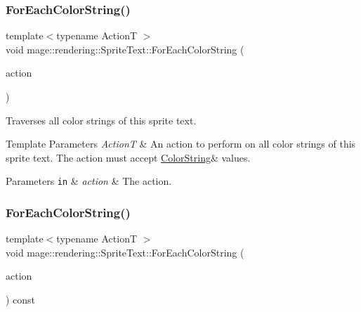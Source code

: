 \subsubsection{\texorpdfstring{For\+Each\+Color\+String()}{ForEachColorString()}\hspace{0.1cm}{\footnotesize\ttfamily [1/2]}}
{\footnotesize\ttfamily template$<$typename ActionT $>$ \\
void mage\+::rendering\+::\+Sprite\+Text\+::\+For\+Each\+Color\+String (\begin{DoxyParamCaption}\item[{ActionT \&\&}]{action }\end{DoxyParamCaption})}

Traverses all color strings of this sprite text.


\begin{DoxyTemplParams}{Template Parameters}
{\em ActionT} & An action to perform on all color strings of this sprite text. The action must accept {\ttfamily \mbox{\hyperlink{classmage_1_1rendering_1_1_color_string}{Color\+String}}\&} values. \\
\hline
\end{DoxyTemplParams}

\begin{DoxyParams}[1]{Parameters}
\mbox{\tt in}  & {\em action} & The action. \\
\hline
\end{DoxyParams}
\mbox{\label{classmage_1_1rendering_1_1_sprite_text_a4d53ac7323640025e6ef78f3863703d3}} 
\subsubsection{\texorpdfstring{For\+Each\+Color\+String()}{ForEachColorString()}\hspace{0.1cm}{\footnotesize\ttfamily [2/2]}}
{\footnotesize\ttfamily template$<$typename ActionT $>$ \\
void mage\+::rendering\+::\+Sprite\+Text\+::\+For\+Each\+Color\+String (\begin{DoxyParamCaption}\item[{ActionT \&\&}]{action }\end{DoxyParamCaption}) const}


